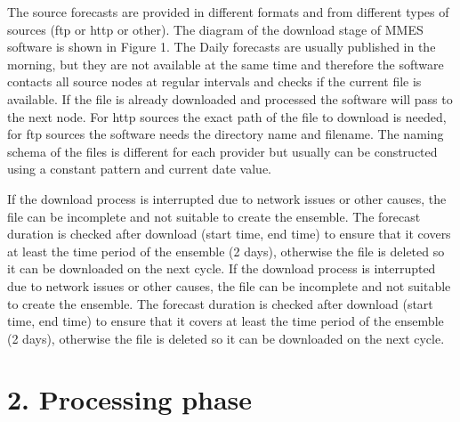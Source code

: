 \documentclass[letterpaper,10pt,english]{sphinxmanual}
\begin{document}
The source forecasts are provided in different formats and from different types of sources (ftp or http or other). The diagram of the download stage of MMES software is shown in Figure 1. The Daily forecasts are usually published in the morning, but they are not available at the same time and therefore the software contacts all source nodes at regular intervals and checks if the current file is available. If the file is already downloaded and processed the software will pass to the next node.
For http sources the exact path of the file to download is needed, for ftp sources the software needs the directory name and filename. The naming schema of the files is different for each provider but usually can be constructed using a constant pattern and current date value.

If the download process is interrupted due to network issues or other causes, the file can be incomplete and not suitable to create the ensemble. The forecast duration is checked after download (start time, end time) to ensure that it covers at least the time period of the ensemble (2 days), otherwise the file is deleted so it can be downloaded on the next cycle. If the download process is interrupted due to network issues or other causes, the file can be incomplete and not suitable to create the ensemble. The forecast duration is checked after download (start time, end time) to ensure that it covers at least the time period of the ensemble (2 days), otherwise the file is deleted so it can be downloaded on the next cycle.


\section{2. Processing phase}
\label{\detokenize{howitworks/index:processing-phase}}\begin{quote}

\begin{figure}[H]
\centering

\noindent{}
\end{figure}
\end{quote}
\end{document}

